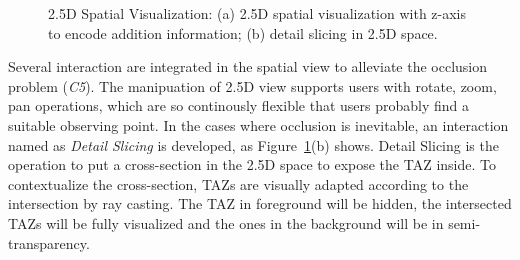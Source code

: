 \begin{figure}[htb!]
\centering
{}\hspace{5pt}
\hspace{5pt}
\caption{2.5D Spatial Visualization: (a) 2.5D spatial visualization with z-axis to encode addition information; (b) detail slicing in 2.5D space.}
\label{fig:2.5D}
\end{figure}

Several interaction are integrated in the spatial view to alleviate the occlusion problem (\textit{C5}). The manipuation of 2.5D view supports users with rotate, zoom, pan operations, which are so continously flexible that users probably find a suitable observing point. In the cases where occlusion is inevitable, an interaction named as \textit{Detail Slicing} is developed, as Figure~\ref{fig:2.5D}(b) shows. Detail Slicing is the operation to put a cross-section in the 2.5D space to expose the TAZ inside. To contextualize the cross-section, TAZs are visually adapted according to the intersection by ray casting. The TAZ in foreground will be hidden, the intersected TAZs will be fully visualized and the ones in the background will be in semi-transparency.

